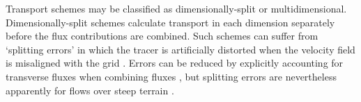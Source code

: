 %

%
%
%
%
%
%
%
%

Transport schemes may be classified as dimensionally-split or multidimensional.  Dimensionally-split schemes calculate transport in each dimension separately before the flux contributions are combined.  Such schemes can suffer from `splitting errors' in which the tracer is artificially distorted when the velocity field is misaligned with the grid \citep{leonard1993}.  Errors can be reduced by explicitly accounting for transverse fluxes when combining fluxes \citep{leonard1996}, but splitting errors are nevertheless apparently for flows over steep terrain \citep{weller2017}.




